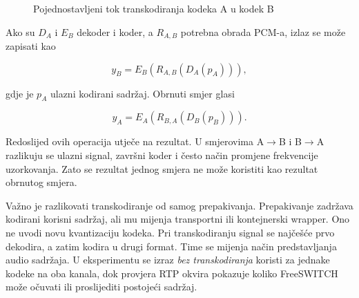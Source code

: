 \begin{figure}[htbp]
\centering
{}
\caption{Pojednostavljeni tok transkodiranja kodeka A u kodek B}
\label{fig:transcode-pipeline}
\end{figure}

Ako su $D_A$ i $E_B$ dekoder i koder, a $R_{A,B}$ potrebna obrada PCM-a, izlaz se može zapisati kao

\begin{equation}
y_B=E_B\!\left(R_{A,B}\!\left(D_A(p_A)\right)\right),
\end{equation}

gdje je $p_A$ ulazni kodirani sadržaj. Obrnuti smjer glasi

\begin{equation}
y_A=E_A\!\left(R_{B,A}\!\left(D_B(p_B)\right)\right).
\end{equation}

Redoslijed ovih operacija utječe na rezultat. U smjerovima A$\rightarrow$B i B$\rightarrow$A razlikuju se ulazni signal, završni koder i često način promjene frekvencije uzorkovanja. Zato se rezultat jednog smjera ne može koristiti kao rezultat obrnutog smjera.

Važno je razlikovati transkodiranje od samog prepakivanja. Prepakivanje zadržava kodirani korisni sadržaj, ali mu mijenja transportni ili kontejnerski wrapper. Ono ne uvodi novu kvantizaciju kodeka. Pri transkodiranju signal se najčešće prvo dekodira, a zatim kodira u drugi format. Time se mijenja način predstavljanja audio sadržaja. U eksperimentu se izraz \emph{bez transkodiranja} koristi za jednake kodeke na oba kanala, dok provjera RTP okvira pokazuje koliko FreeSWITCH može očuvati ili proslijediti postojeći sadržaj.

